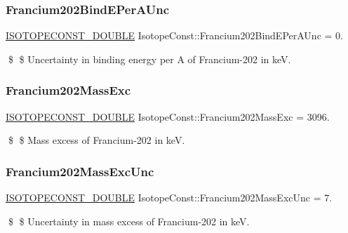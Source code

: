\subsubsection{\texorpdfstring{Francium202\+Bind\+E\+Per\+A\+Unc}{Francium202BindEPerAUnc}}
{\footnotesize\ttfamily \mbox{\hyperlink{group___isotope_const-_macros_ga8f45a7272ce02c0b4c65c44636ed719a}{I\+S\+O\+T\+O\+P\+E\+C\+O\+N\+S\+T\+\_\+\+D\+O\+U\+B\+LE}} Isotope\+Const\+::\+Francium202\+Bind\+E\+Per\+A\+Unc = 0.}

\$ \$ Uncertainty in binding energy per A of Francium-\/202 in keV. \mbox{\label{group___isotope_const-_francium-_fr202_ga71665cc48bbb426812f4501c478b1c35}} 
\subsubsection{\texorpdfstring{Francium202\+Mass\+Exc}{Francium202MassExc}}
{\footnotesize\ttfamily \mbox{\hyperlink{group___isotope_const-_macros_ga8f45a7272ce02c0b4c65c44636ed719a}{I\+S\+O\+T\+O\+P\+E\+C\+O\+N\+S\+T\+\_\+\+D\+O\+U\+B\+LE}} Isotope\+Const\+::\+Francium202\+Mass\+Exc = 3096.}

\$ \$ Mass excess of Francium-\/202 in keV. \mbox{\label{group___isotope_const-_francium-_fr202_gafe4e1af47b4030a793ed53326c72542a}} 
\subsubsection{\texorpdfstring{Francium202\+Mass\+Exc\+Unc}{Francium202MassExcUnc}}
{\footnotesize\ttfamily \mbox{\hyperlink{group___isotope_const-_macros_ga8f45a7272ce02c0b4c65c44636ed719a}{I\+S\+O\+T\+O\+P\+E\+C\+O\+N\+S\+T\+\_\+\+D\+O\+U\+B\+LE}} Isotope\+Const\+::\+Francium202\+Mass\+Exc\+Unc = 7.}

\$ \$ Uncertainty in mass excess of Francium-\/202 in keV. \mbox{\label{group___isotope_const-_francium-_fr202_gac6907e010d538991cb6fd3de9066744b}} 
